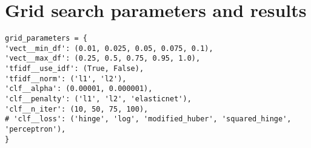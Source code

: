 \begin{comment}
Should this be used, is this relevant? Seems a bit like whining over everything that failed, etc.

Another issue was that since few tutorials had the data sets available, it was hard to compare my results against theirs to (considering version changes).
In Scikit-learns tutorial for text data \cite{Scikitlearn.org2016h}, they have at the end task suggestions, with attached solutions in the Scikit-learn library.
When looking at the solution for the second task (sentiment analysis), I saw that they used \gls{sgd} (see \cite{Scikitlearn.org2016f}).
Looking at the suggested "road map" (see Appendix \ref{app:ml_map}, Figure \ref{fig:ml_map} on p.~\pageref{app:ml_map}), 
I accidentally misread a zero and decided to go with \gls{sgd} instead of \gls{svc}.
\vspace{0.5em}\newline
When understanding more about how GridSearchCV worked and how one could select the best parameters from it, things got back on track. 
However, when comparing it against the \gls{svc}, it turned out that the \gls{svc} got a higher score\footnote{
A comparison was done on \gls{sgd}, \gls{svc} and LinearSVC using GridSearchCV.
}. 
\end{comment}


\section{Grid search parameters and results}
\label{sec:grid_search_and_results}



\begin{lstlisting}[caption={Parameters for SGD}, label={lst:param_sgd}] 
grid_parameters = {
'vect__min_df': (0.01, 0.025, 0.05, 0.075, 0.1),
'vect__max_df': (0.25, 0.5, 0.75, 0.95, 1.0),
'tfidf__use_idf': (True, False),
'tfidf__norm': ('l1', 'l2'),
'clf__alpha': (0.00001, 0.000001),
'clf__penalty': ('l1', 'l2', 'elasticnet'),
'clf__n_iter': (10, 50, 75, 100),
# 'clf__loss': ('hinge', 'log', 'modified_huber', 'squared_hinge', 'perceptron'),
}
\end{lstlisting}


